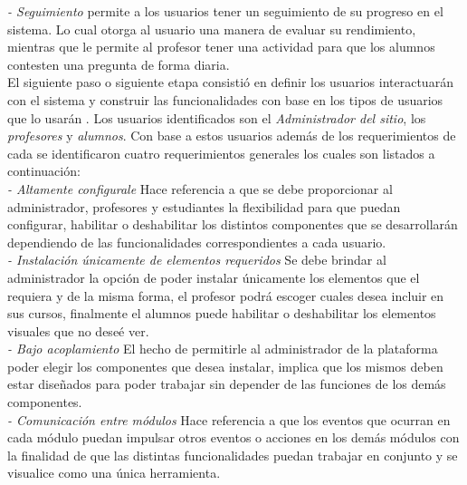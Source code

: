     {\it - Seguimiento} permite a los usuarios tener un seguimiento de su progreso
    en el sistema. Lo cual otorga al usuario una manera de evaluar su rendimiento,
    mientras que le permite al profesor tener una actividad para que los alumnos
    contesten una pregunta de forma diaria.\\

    \noindent
    El siguiente paso o siguiente etapa consistió en definir los usuarios
    interactuarán con el sistema y construir las funcionalidades con base en los
    tipos de usuarios que lo usarán \cite{ForTheWin}. Los usuarios
    identificados son el {\it Administrador del sitio}, los {\it profesores} y
    {\it alumnos}. Con base a estos usuarios además de los requerimientos de cada se
    identificaron cuatro requerimientos generales los cuales son listados a
    continuación:\\

    {\it - Altamente configurale}
        Hace referencia a que se debe proporcionar al administrador, profesores
        y estudiantes la flexibilidad para que puedan configurar, habilitar o
        deshabilitar los distintos componentes que se desarrollarán dependiendo
        de las funcionalidades correspondientes a cada usuario.\\

    {\it - Instalación únicamente de elementos requeridos}
        Se debe brindar al administrador la opción de poder instalar únicamente
        los elementos que el requiera y de la misma forma, el profesor podrá escoger
        cuales desea incluir en sus cursos, finalmente el alumnos puede habilitar o
        deshabilitar los elementos visuales que no deseé ver.\\

    {\it - Bajo acoplamiento}
        El hecho de permitirle al administrador de la plataforma poder elegir los
        componentes que desea instalar, implica que los mismos deben estar
        diseñados para poder trabajar sin depender de las funciones de los demás
        componentes.\\

    {\it - Comunicación entre módulos}
        Hace referencia a que los eventos que ocurran en cada módulo puedan impulsar
        otros eventos o acciones en los demás módulos con la finalidad de que las
        distintas funcionalidades puedan trabajar en conjunto y se visualice como
        una única herramienta.\\

